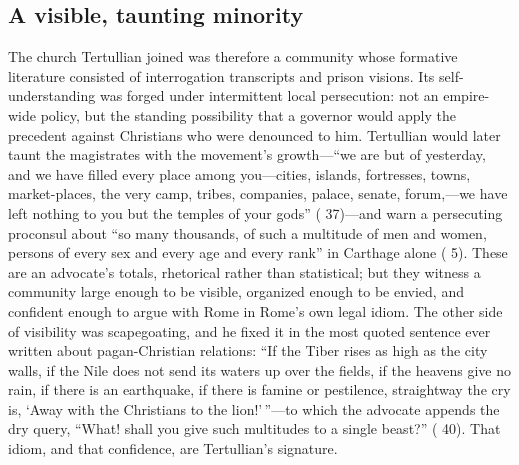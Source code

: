 
\subsection{A visible, taunting minority}

The church Tertullian joined was therefore a community whose formative
literature consisted of interrogation transcripts and prison visions. Its
self-understanding was forged under intermittent local persecution: not an
empire-wide policy, but the standing possibility that a governor would apply
the precedent against Christians who were denounced to him. Tertullian would
later taunt the magistrates with the movement's growth---``we are but of
yesterday, and we have filled every place among you---cities, islands,
fortresses, towns, market-places, the very camp, tribes, companies, palace,
senate, forum,---we have left nothing to you but the temples of your gods''
( 37)---and warn a persecuting proconsul about ``so many
thousands, of such a multitude of men and women, persons of every sex and every
age and every rank'' in Carthage alone ( 5). These are an
advocate's totals, rhetorical rather than statistical; but they witness a
community large enough to be visible, organized enough to be envied, and
confident enough to argue with Rome in Rome's own legal idiom. The other side
of visibility was scapegoating, and he fixed it in the most quoted sentence
ever written about pagan-Christian relations: ``If the Tiber rises as high as
the city walls, if the Nile does not send its waters up over the fields, if
the heavens give no rain, if there is an earthquake, if there is famine or
pestilence, straightway the cry is, `Away with the Christians to the
lion!'\,''---to which the advocate appends the dry query, ``What! shall you
give such multitudes to a single beast?'' ( 40). That idiom,
and that confidence, are Tertullian's signature.
